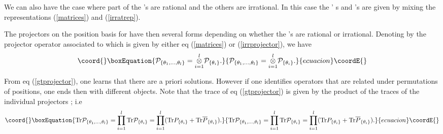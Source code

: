 \documentclass[a4paper,12pt]{article}
\begin{document}
We can also have the case where part of the \coordHE{}'s are rational and
the others are irrational. In this case the \coordHE{}' s and \coordHE{}'s are
given by mixing the representations (\ref{matrices}) and (\ref{irratrep}).

The projectors \coordHE{} on the position basis \coordHE{} for \coordHE{} have then several forms depending on whether the \coordHE{}'s are rational or irrational. Denoting by \coordHE{} the projector operator associated to \coordHE{}
which is given by either eq (\ref{matrices}) or (\ref{irrprojector}), we
have
\begin{equation}\coord{}\boxEquation{
\mathcal{P}_{\left\{ \theta _{1},\ldots ,\theta _{l}\right\} }=\overset{l}{
\underset{i=1}{\otimes }}\mathcal{P}_{\left\{ \theta _{i}\right\} }.
\label{gtprojector}
}{
\mathcal{P}_{\left\{ \theta _{1},\ldots ,\theta _{l}\right\} }=\overset{l}{
\underset{i=1}{\otimes }}\mathcal{P}_{\left\{ \theta _{i}\right\} }.
}{ecuacion}\coordE{}\end{equation}

From eq (\ref{gtprojector}), one learns that there are a priori
\coordHE{} solutions. However if one identifies operators that are
related under permutations of positions, one ends then with \coordHE{}
different objects. Note that the trace of eq (\ref{gtprojector})
is given by the product of the traces of the individual projectors
\coordHE{}; i.e
\begin{equation}\coord{}\boxEquation{
\text{Tr}\mathcal{P}_{\left\{ \theta _{1},\ldots ,\theta
_{l}\right\} }=\prod_{i=1}^{l}\text{Tr}\mathcal{P}_{\left\{ \theta
_{i}\right\} }=\prod_{i=1}^{l}(\text{Tr}P_{\left\{ \theta
_{i}\right\} }+\text{Tr}\overline{P}_{\left\{ \theta _{i}\right\}
}). \label{traceproj}
}{
\text{Tr}\mathcal{P}_{\left\{ \theta _{1},\ldots ,\theta
_{l}\right\} }=\prod_{i=1}^{l}\text{Tr}\mathcal{P}_{\left\{ \theta
_{i}\right\} }=\prod_{i=1}^{l}(\text{Tr}P_{\left\{ \theta
_{i}\right\} }+\text{Tr}\overline{P}_{\left\{ \theta _{i}\right\}
}). }{ecuacion}\coordE{}\end{equation}
\end{document}
